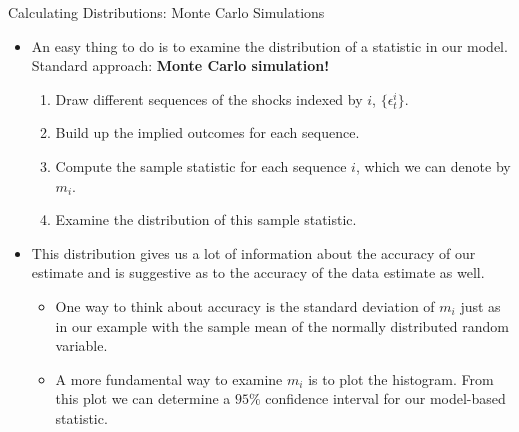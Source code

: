 \documentclass[10pt,c,aspectratio=1610,handout]{beamer}
\begin{document}
\begin{frame}{Calculating Distributions: Monte Carlo Simulations}%
  \begin{itemize}%
    \item[$\blacktriangleright$] An easy thing to do is to examine the distribution of a statistic in our model.\\Standard approach: \textbf{Monte Carlo simulation!}%
    \pause%
    \begin{enumerate}%
      \item Draw different sequences of the shocks indexed by $i$, $\{ \epsilon^{i}_{t} \}$.%
      \pause%
      \item Build up the implied outcomes for each sequence.%
      \pause%
      \item Compute the sample statistic for each sequence $i$, which we can denote by $m_i$.
      \pause%
      \item Examine the distribution of this sample statistic.%
    \end{enumerate}%
    \medskip%
    \pause%
    \item[$\blacktriangleright$] This distribution gives us a lot of information about the accuracy of our estimate and is suggestive as to the accuracy of the data estimate as well.%
    \pause%
    \begin{itemize}%
      \item[$\rightarrow$] One way to think about accuracy is the standard deviation of $m_i$ just as in our example with the sample mean of the normally distributed random variable.%
      \pause%
      \item[$\rightarrow$] A more fundamental way to examine $m_i$ is to plot the histogram. From this plot we can determine a $95 \%$ confidence interval for our model-based statistic.%
    \end{itemize}%
  \end{itemize}%
\end{frame}%
\end{document}
